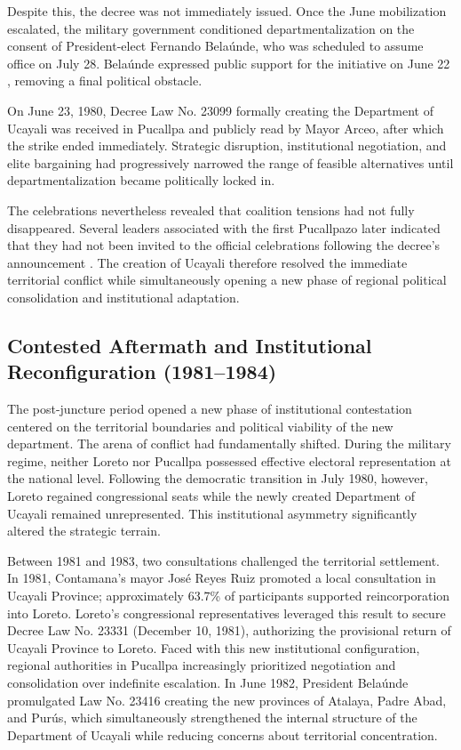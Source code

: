 \documentclass[12pt]{article}
\begin{document}
Despite this, the decree was not immediately issued. Once the June mobilization 
escalated, the military government conditioned departmentalization on the consent 
of President-elect Fernando Belaúnde, who was scheduled to assume office on 
July 28. Belaúnde expressed public support for the initiative on June 22 
\parencite{tapuya_huaman_documental_2024}, removing a final political obstacle.

On June 23, 1980, Decree Law No. 23099 formally creating the Department of 
Ucayali was received in Pucallpa and publicly read by Mayor Arceo, after which 
the strike ended immediately. Strategic disruption, institutional negotiation, 
and elite bargaining had progressively narrowed the range of feasible 
alternatives until departmentalization became politically locked in.

The celebrations nevertheless revealed that coalition tensions had not fully disappeared. Several leaders associated with the first Pucallpazo later indicated that they had not been invited to the official celebrations following the decree’s announcement \parencite{matos_tuesta_pucallpazos_2020-1}. The creation of Ucayali therefore resolved the immediate territorial conflict while simultaneously opening a new phase of regional political consolidation and institutional adaptation.

\subsection{Contested Aftermath and Institutional Reconfiguration (1981--1984)}

The post-juncture period opened a new phase of institutional contestation centered on the territorial boundaries and political viability of the new department. The arena of conflict had fundamentally shifted. During the military regime, neither Loreto nor Pucallpa possessed effective electoral representation at the national level. Following the democratic transition in July 1980, however, Loreto regained congressional seats while the newly created Department of Ucayali remained unrepresented. This institutional asymmetry significantly altered the strategic terrain.

Between 1981 and 1983, two consultations challenged the territorial settlement. In 1981, Contamana's mayor José Reyes Ruiz promoted a local consultation in Ucayali Province; approximately 63.7\% of participants supported reincorporation into Loreto. Loreto's congressional representatives leveraged this result to secure Decree Law No. 23331 (December 10, 1981), authorizing the provisional return of Ucayali Province to Loreto. Faced with this new institutional configuration, regional authorities in Pucallpa increasingly prioritized negotiation and consolidation over indefinite escalation. In June 1982, President Belaúnde promulgated Law No. 23416 creating the new provinces of Atalaya, Padre Abad, and Purús, which simultaneously strengthened the internal structure of the Department of Ucayali while reducing concerns about territorial concentration.
\end{document}
